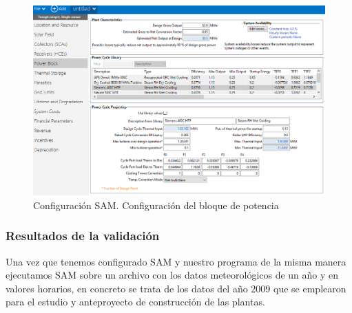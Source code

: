 \documentclass[11pt]{article}
\begin{document}
\begin{figure}
\includegraphics[scale=0.8]{images/captura_sam04.png}
\caption{Configuración SAM. Configuración del bloque de potencia} 
\label{fig:captura04}
\end{figure}

\hypertarget{resultados-de-la-validaciuxf3n}{%
\subsubsection{Resultados de la
validación}\label{resultados-de-la-validaciuxf3n}}

Una vez que tenemos configurado SAM y nuestro programa de la misma
manera ejecutamos SAM sobre un archivo con los datos meteorológicos de
un año y en valores horarios, en concreto se trata de los datos del año
2009 que se emplearon para el estudio y anteproyecto de construcción de
las plantas.
\end{document}
